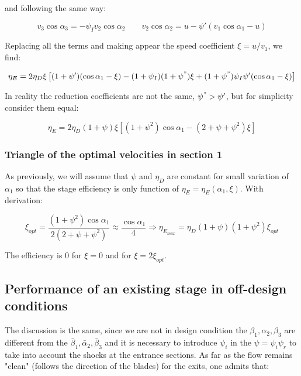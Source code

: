 and following the same way: 

\begin{equation}
v_3 \cos \alpha _3 = - \psi _I v_2 \cos \alpha _2 \qquad v_2 \cos \alpha _2 = u - \psi '(v_1 \cos \alpha _1 - u)
\end{equation}

Replacing all the terms and making appear the speed coefficient $\xi = u/v_1$, we find: 

\begin{equation}
\eta _E = 2\eta _D \xi \left[(1+\psi ')(\cos \alpha _1 -\xi) - (1+\psi _I ) (1+ \psi ^")\xi+ (1+\psi ^") \psi _I \psi '(\cos \alpha _1 -\xi) \right]
\end{equation}

In reality the reduction coefficients are not the same, $\psi ^" > \psi '$, but for simplicity consider them equal: 

\begin{equation}
\eta _E = 2\eta _D (1+\psi)\xi [(1+\psi ^2)\cos \alpha _1 - (2+\psi + \psi ^2)\xi]
\end{equation}

\subsubsection{Triangle of the optimal velocities in section 1}
As previously, we will assume that $\psi$ and $\eta _D$ are constant for small variation of $\alpha _1$ so that the stage efficiency is only function of $\eta _E = \eta _E (\alpha _1 , \xi)$. With derivation: 

\begin{equation}
\xi _{opt} = \frac{(1+\psi ^2)\cos \alpha _1}{2 (2+\psi +\psi ^2)} \approx \frac{\cos \alpha _1}{4} \Rightarrow \eta _{E_{max}} = \eta _D (1+\psi ) (1+\psi ^2) \xi_{opt}
\end{equation}

The efficiency is 0 for $\xi = 0$ and for $\xi = 2\xi _{opt}$.

\subsection{Performance of an existing stage in off-design conditions}
The discussion is the same, since we are not in design condition the $\beta _1,\alpha _2,\beta _3$ are different from  the $\bar{\beta}_1,\bar{\alpha}_2, \bar{\beta}_3$ and it is necessary to introduce $\psi _i$ in the $\psi = \psi _i \psi _r$ to take into account the shocks at the entrance sections. As far as the flow remains "clean" (follows the direction of the blades) for the exits, one admits that: 

